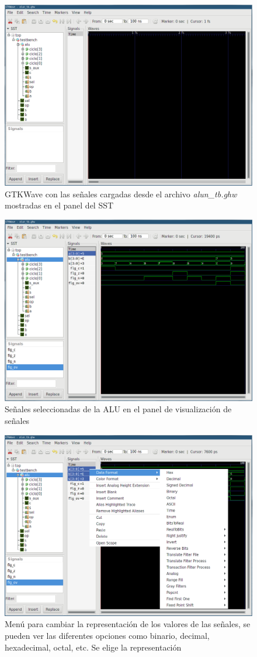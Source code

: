 \documentclass[11pt]{article}
\begin{document}
\begin{figure}[H]
    \centering
    \includegraphics[width=.65\linewidth]{gtkwave4.png}
    \caption{GTKWave con las señales cargadas desde el archivo
    \textit{alun\_tb.ghw} mostradas en el panel del SST}
    \label{fig:gtkwave-4}
\end{figure}

\begin{figure}[H]
    \centering
    \includegraphics[width=.75\linewidth]{gtkwave5.png}
    \caption{Señales seleccionadas de la ALU en el panel de visualización de señales}
    \label{fig:gtkwave-5}
\end{figure}

\begin{figure}[H]
    \centering
    \includegraphics[width=.75\linewidth]{gtkwave6.png}
    \caption{Menú para cambiar la representación de los valores de las señales, se pueden
    ver las diferentes opciones como binario, decimal, hexadecimal, octal, etc.
    Se elige la representación}
    \label{fig:gtkwave-6}
\end{figure}
\end{document}
